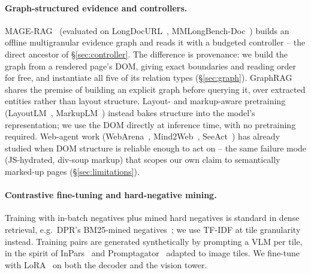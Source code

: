 \paragraph{Graph-structured evidence and controllers.} MAGE-RAG~\citep{magerag2026} (evaluated on LongDocURL~\citep{longdocurl2024}, MMLongBench-Doc~\citep{mmlongbenchdoc2024}) builds an offline multigranular evidence graph and reads it with a budgeted controller -- the direct ancestor of \S\ref{sec:controller}. The difference is provenance: we build the graph from a rendered page's DOM, giving exact boundaries and reading order for free, and instantiate all five of its relation types (\S\ref{sec:graph}). GraphRAG~\citep{graphrag2024} shares the premise of building an explicit graph before querying it, over extracted entities rather than layout structure. Layout- and markup-aware pretraining (LayoutLM~\citep{layoutlm2020}, MarkupLM~\citep{markuplm2022}) instead bakes structure into the model's representation; we use the DOM directly at inference time, with no pretraining required. Web-agent work (WebArena~\citep{webarena2023}, Mind2Web~\citep{mind2web2023}, SeeAct~\citep{seeact2024}) has already studied when DOM structure is reliable enough to act on -- the same failure mode (JS-hydrated, div-soup markup) that scopes our own claim to semantically marked-up pages (\S\ref{sec:limitations}).

\paragraph{Contrastive fine-tuning and hard-negative mining.} Training with in-batch negatives plus mined hard negatives is standard in dense retrieval, e.g.\ DPR's BM25-mined negatives~\citep{dpr2020}; we use TF-IDF at tile granularity instead. Training pairs are generated synthetically by prompting a VLM per tile, in the spirit of InPars~\citep{inpars2022} and Promptagator~\citep{promptagator2022} adapted to image tiles. We fine-tune with LoRA~\citep{lora2021} on both the decoder and the vision tower.
